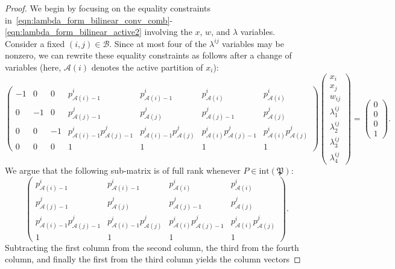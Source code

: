 \documentclass{article}
\begin{document}
\begin{proof}
We begin by focusing on the equality constraints in~\eqref{eqn:lambda_form_bilinear_conv_comb}-\eqref{eqn:lambda_form_bilinear_active2} involving the $x$, $w$, and $\lambda$ variables. 
Consider a fixed $(i,j) \in \mathcal{B}$.
Since at most four of the $\lambda^{ij}$ variables may be nonzero, we can rewrite these equality constraints as follows after a change of variables (here, $\mathcal{A}(i)$ denotes the active partition of $x_i$):
{
\footnotesize
\[
\begin{pmatrix}
-1 & 0 & 0 & p^i_{\mathcal{A}(i)-1} & p^i_{\mathcal{A}(i)-1} & p^i_{\mathcal{A}(i)} & p^i_{\mathcal{A}(i)} \\
0 & -1 & 0 & p^j_{\mathcal{A}(j)-1} & p^j_{\mathcal{A}(j)} & p^j_{\mathcal{A}(j)-1} & p^j_{\mathcal{A}(j)} \\
0 & 0 & -1 & p^i_{\mathcal{A}(i)-1} p^j_{\mathcal{A}(j)-1} & p^i_{\mathcal{A}(i)-1} p^j_{\mathcal{A}(j)} & p^i_{\mathcal{A}(i)} p^j_{\mathcal{A}(j)-1} & p^i_{\mathcal{A}(i)} p^j_{\mathcal{A}(j)} \\
0 & 0 & 0 & 1 & 1 & 1 & 1
\end{pmatrix}
\begin{pmatrix}
x_i \\
x_j \\
w_{ij} \\
\lambda^{ij}_1 \\
\lambda^{ij}_2 \\
\lambda^{ij}_3 \\
\lambda^{ij}_4
\end{pmatrix}
= \begin{pmatrix}
0 \\
0 \\
0 \\
1
\end{pmatrix}.
\]
}
We argue that the following sub-matrix is of full rank whenever $P \in \text{int}(\mathfrak{P})$:
\[
\begin{pmatrix}
p^i_{\mathcal{A}(i)-1} & p^i_{\mathcal{A}(i)-1} & p^i_{\mathcal{A}(i)} & p^i_{\mathcal{A}(i)} \\
p^j_{\mathcal{A}(j)-1} & p^j_{\mathcal{A}(j)} & p^j_{\mathcal{A}(j)-1} & p^j_{\mathcal{A}(j)} \\
p^i_{\mathcal{A}(i)-1} p^j_{\mathcal{A}(j)-1} & p^i_{\mathcal{A}(i)-1} p^j_{\mathcal{A}(j)} & p^i_{\mathcal{A}(i)} p^j_{\mathcal{A}(j)-1} & p^i_{\mathcal{A}(i)} p^j_{\mathcal{A}(j)} \\
1 & 1 & 1 & 1
\end{pmatrix}.
\]
Subtracting the first column from the second column, the third from the fourth column, and finally the first from the third column yields the column vectors 

\end{proof}
\end{document}
